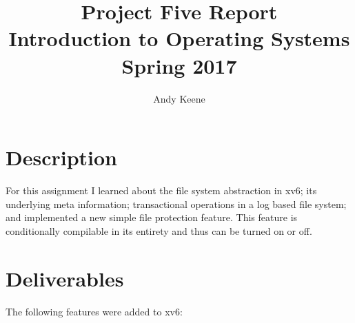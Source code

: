 \documentclass[11pt,letterpaper]{report}
\author{Andy Keene}
\title{Project Five Report\\Introduction to Operating Systems\\ Spring 2017}
\date{}
\begin{document}
	\maketitle
	

	\section*{Description}
	For this assignment I learned about the file system abstraction in xv6; its underlying meta information; transactional operations in a log based file system; 
	and implemented a new simple file protection feature. This feature is conditionally compilable in its entirety and thus can be turned on or off. 
			
	\section*{Deliverables}
	The following features were added to xv6:
\end{document}
